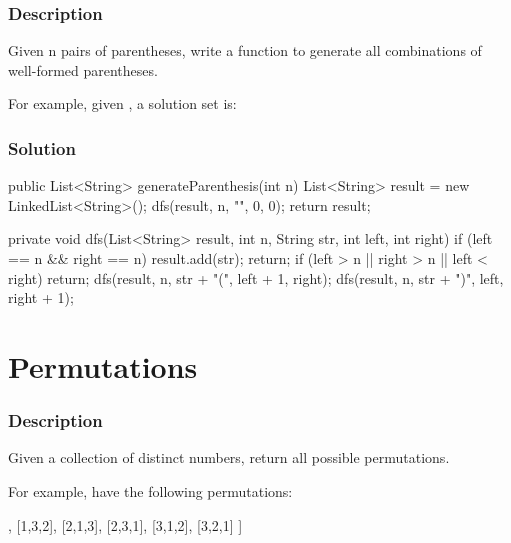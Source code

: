 \subsubsection{Description}
Given n pairs of parentheses, write a function to generate all combinations of well-formed parentheses.

For example, given , a solution set is:
\begin{Code}
[
  "((()))",
  "(()())",
  "(())()",
  "()(())",
  "()()()"
]
\end{Code}

\subsubsection{Solution}

\begin{Code}
public List<String> generateParenthesis(int n) {
    List<String> result = new LinkedList<String>();
    dfs(result, n, "", 0, 0);
    return result;
}

private void dfs(List<String> result, int n, String str, int left, int right) {
    if (left == n && right == n) {
        result.add(str);
        return;
    }
    if (left > n || right > n || left < right) {
        return;
    }
    dfs(result, n, str + "(", left + 1, right);
    dfs(result, n, str + ")", left, right + 1);
}
\end{Code}

\newpage

\section{Permutations}

\subsubsection{Description}
Given a collection of distinct numbers, return all possible permutations.

For example, \code{[1,2,3]} have the following permutations:
\begin{Code}
[
  [1,2,3],
  [1,3,2],
  [2,1,3],
  [2,3,1],
  [3,1,2],
  [3,2,1]
]
\end{Code}


